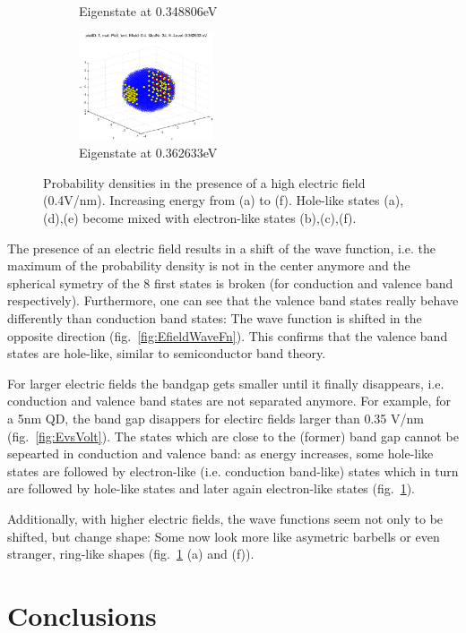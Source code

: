 \begin{figure}
\begin{subfigure}{150px}
		\caption{Eigenstate at 0.348806eV}
	\end{subfigure}
	\begin{subfigure}{150px}
		\includegraphics[width=150px]{Fig/Plots/r25v04Mod34}
		\caption{Eigenstate at 0.362633eV}
	\end{subfigure}
	\caption{Probability densities in the presence of a high electric field (0.4V/nm). Increasing energy from (a) to (f). Hole-like states (a),(d),(e) become mixed with electron-like states (b),(c),(f).}
	\label{fig:HighEfieldWaveFn}
\end{figure}


The presence of an electric field results in a shift of the wave function, i.e. the maximum of the probability density is not in the center anymore and the spherical symetry of the 8 first states is broken (for conduction and valence band respectively). Furthermore, one can see that the valence band states really behave differently than conduction band states: The wave function is shifted in the opposite direction (fig.~\ref{fig:EfieldWaveFn}). This confirms that the valence band states are hole-like, similar to semiconductor band theory. 
	
For larger electric fields the bandgap gets smaller until it finally disappears, i.e. conduction and valence band states are not separated anymore. For example, for a 5nm  QD, the band gap disappers for electirc fields larger than 0.35 V/nm (fig.~\ref{fig:EvsVolt}). The states which are close to the (former) band gap cannot be sepearted in conduction and valence band: as energy increases, some hole-like states are followed by electron-like (i.e. conduction band-like) states which in turn are followed by hole-like states and later again electron-like states (fig.~\ref{fig:HighEfieldWaveFn}).
	
Additionally, with higher electric fields, the wave functions seem not only to be shifted, but change shape: Some now look more like asymetric barbells or even stranger, ring-like shapes (fig.~\ref{fig:HighEfieldWaveFn} (a) and (f)).

\FloatBarrier

\section{Conclusions}


